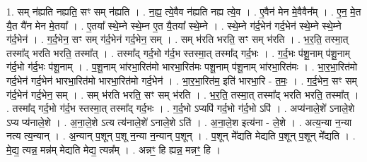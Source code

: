 \documentclass[17pt]{extarticle}
\begin{document}
1. सम् न॑ह्यति नह्यति॒ सꣳ सम् न॑ह्यति । . न॒ह्य॒ त्ये॒वैव न॑ह्यति नह्य त्ये॒व । . ए॒वैन॑ मेन मे॒वैवैन᳚म् । . ए॒न॒ मे॒त यै॒त यै॑न मेन मे॒तया᳚ । . ए॒तया᳚ स्थे॒म्ने स्थे॒म्न ए॒त यै॒तया᳚ स्थे॒म्ने । . स्थे॒म्ने ग॑र्द॒भेन॑ गर्द॒भेन॑ स्थे॒म्ने स्थे॒म्ने ग॑र्द॒भेन॑ । . ग॒र्द॒भेन॒ सꣳ सम् ग॑र्द॒भेन॑ गर्द॒भेन॒ सम् । . सम् भ॑रति भरति॒ सꣳ सम् भ॑रति । . भ॒र॒ति॒ तस्मा॒त् तस्मा᳚द् भरति भरति॒ तस्मा᳚त् । . तस्मा᳚द् गर्द॒भो ग॑र्द॒भ स्तस्मा॒त् तस्मा᳚द् गर्द॒भः । . ग॒र्द॒भः प॑शू॒नाम् प॑शू॒नाम् ग॑र्द॒भो ग॑र्द॒भः प॑शू॒नाम् । . प॒शू॒नाम् भा॑रभा॒रित॑मो भारभा॒रित॑मः पशू॒नाम् प॑शू॒नाम् भा॑रभा॒रित॑मः । . भा॒र॒भा॒रित॑मो गर्द॒भेन॑ गर्द॒भेन॑ भारभा॒रित॑मो भारभा॒रित॑मो गर्द॒भेन॑ । . भा॒र॒भा॒रित॑म॒ इति॑ भारभा॒रि - त॒मः॒ । . ग॒र्द॒भेन॒ सꣳ सम् ग॑र्द॒भेन॑ गर्द॒भेन॒ सम् । . सम् भ॑रति भरति॒ सꣳ सम् भ॑रति । . भ॒र॒ति॒ तस्मा॒त् तस्मा᳚द् भरति भरति॒ तस्मा᳚त् । . तस्मा᳚द् गर्द॒भो ग॑र्द॒भ स्तस्मा॒त् तस्मा᳚द् गर्द॒भः । . ग॒र्द॒भो ऽप्यपि॑ गर्द॒भो ग॑र्द॒भो ऽपि॑ । . अप्य॑नाले॒शे॑ ऽनाले॒शे ऽप्य प्य॑नाले॒शे । . अ॒ना॒ले॒शे ऽत्य त्य॑नाले॒शे॑ ऽनाले॒शे ऽति॑ । . अ॒ना॒ले॒श इत्य॑ना - ले॒शे । . अत्य॒न्या न॒न्या नत्य त्य॒न्यान् । . अ॒न्यान् प॒शून् प॒शू न॒न्या न॒न्यान् प॒शून् । . प॒शून् मे᳚द्यति मेद्यति प॒शून् प॒शून् मे᳚द्यति । . मे॒द्य॒ त्यन्न॒ मन्न॑म् मेद्यति मेद्य॒ त्यन्न᳚म् । . अन्नꣳ॒॒ हि ह्यन्न॒ मन्नꣳ॒॒ हि । \newline
\end{document}
